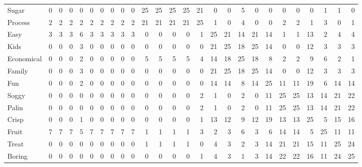 \begin{table}[htb]
{\begin{tabular}{lrrrrrrrrr|rrrrr|rrrr|rrrrrrr}
            Sugar      & 0  & 0  & 0  & 0  & 0  & 0  & 0  & 0  & 0  & 25 & 25 & 25 & 25 & 21 & 0  & 0  & 5  & 0  & 0  & 0  & 0  & 0  & 1  & 1  & 0  \\
            Process    & 2  & 2  & 2  & 2  & 2  & 2  & 2  & 2  & 2  & 21 & 21 & 21 & 21 & 25 & 1  & 0  & 4  & 0  & 0  & 2  & 2  & 1  & 3  & 0  & 1  \\\hline
            Easy       & 3  & 3  & 3  & 6  & 3  & 3  & 3  & 3  & 3  & 0  & 0  & 0  & 0  & 1  & 25 & 21 & 14 & 21 & 14 & 1  & 1  & 13 & 2  & 4  & 4  \\
            Kids       & 0  & 0  & 0  & 3  & 0  & 0  & 0  & 0  & 0  & 0  & 0  & 0  & 0  & 0  & 21 & 25 & 18 & 25 & 14 & 0  & 0  & 12 & 3  & 3  & 3  \\
            Economical & 0  & 0  & 0  & 2  & 0  & 0  & 0  & 0  & 0  & 5  & 5  & 5  & 5  & 4  & 14 & 18 & 25 & 18 & 8  & 2  & 2  & 9  & 6  & 2  & 1  \\
            Family     & 0  & 0  & 0  & 3  & 0  & 0  & 0  & 0  & 0  & 0  & 0  & 0  & 0  & 0  & 21 & 25 & 18 & 25 & 14 & 0  & 0  & 12 & 3  & 3  & 3  \\\hline
            Fun        & 0  & 0  & 0  & 2  & 0  & 0  & 0  & 0  & 0  & 0  & 0  & 0  & 0  & 0  & 14 & 14 & 8  & 14 & 25 & 11 & 11 & 19 & 6  & 14 & 14 \\
            Soggy      & 0  & 0  & 0  & 0  & 0  & 0  & 0  & 0  & 0  & 0  & 0  & 0  & 0  & 2  & 1  & 0  & 2  & 0  & 11 & 25 & 25 & 13 & 14 & 21 & 22 \\
            Palin      & 0  & 0  & 0  & 0  & 0  & 0  & 0  & 0  & 0  & 0  & 0  & 0  & 0  & 2  & 1  & 0  & 2  & 0  & 11 & 25 & 25 & 13 & 14 & 21 & 22 \\
            Crisp      & 0  & 0  & 0  & 1  & 0  & 0  & 0  & 0  & 0  & 0  & 0  & 0  & 0  & 1  & 13 & 12 & 9  & 12 & 19 & 13 & 13 & 25 & 5  & 15 & 16 \\
            Fruit      & 7  & 7  & 7  & 5  & 7  & 7  & 7  & 7  & 7  & 1  & 1  & 1  & 1  & 3  & 2  & 3  & 6  & 3  & 6  & 14 & 14 & 5  & 25 & 11 & 11 \\
            Treat      & 0  & 0  & 0  & 0  & 0  & 0  & 0  & 0  & 0  & 1  & 1  & 1  & 1  & 0  & 4  & 3  & 2  & 3  & 14 & 21 & 21 & 15 & 11 & 25 & 24 \\
            Boring     & 0  & 0  & 0  & 0  & 0  & 0  & 0  & 0  & 0  & 0  & 0  & 0  & 0  & 1  & 4  & 3  & 1  & 3  & 14 & 22 & 22 & 16 & 11 & 24 & 25 \\
            \bottomrule
        \end{tabular}
    }
\end{table}

